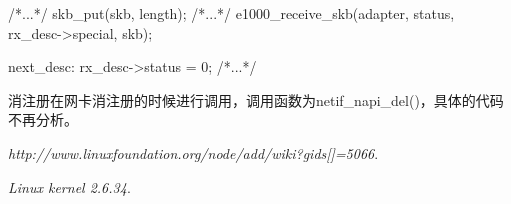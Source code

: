 \documentclass[fontsize=11pt, %
                             paper=a4, %
                             oneside, %
                             captions=tableheading,
                             index=totoc,
                             hyperref]{labbook}
\begin{document}
\begin{addmargin}[0cm]{0cm}
\begin{pyglist}
{{    /*...*/
    skb_put(skb, length);
    /*...*/
    e1000_receive_skb(adapter, status, rx_desc->special, skb);

    next_desc:
      rx_desc->status = 0;
    /*...*/
    }
}
\end{pyglist}
\indent 消注册在网卡消注册的时候进行调用，调用函数为netif\_napi\_del()，具体的代码不再分析。






\end{addmargin}


\begin{thebibliography}{9}

\emph{http://www.linuxfoundation.org/node/add/wiki?gids[]=5066}.

\emph{Linux kernel 2.6.34}.

\end{thebibliography}

\end{document}
